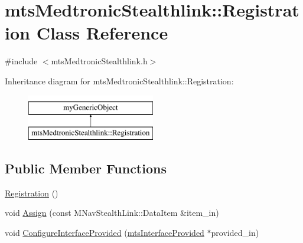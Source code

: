 \hypertarget{classmts_medtronic_stealthlink_1_1_registration}{}\section{mts\+Medtronic\+Stealthlink\+:\+:Registration Class Reference}
\label{classmts_medtronic_stealthlink_1_1_registration}


{\ttfamily \#include $<$mts\+Medtronic\+Stealthlink.\+h$>$}

Inheritance diagram for mts\+Medtronic\+Stealthlink\+:\+:Registration\+:\begin{figure}[H]
\begin{center}
\leavevmode
\includegraphics[height=2.000000cm]{d9/d2e/classmts_medtronic_stealthlink_1_1_registration}
\end{center}
\end{figure}
\subsection*{Public Member Functions}
\begin{DoxyCompactItemize}
\item 
\hyperlink{classmts_medtronic_stealthlink_1_1_registration_a8cf212c78930089706b7c7ab4de22250}{Registration} ()
\item 
void \hyperlink{classmts_medtronic_stealthlink_1_1_registration_aefbb9a745491a4306cdb9c156b7431d2}{Assign} (const M\+Nav\+Stealth\+Link\+::\+Data\+Item \&item\+\_\+in)
\item 
void \hyperlink{classmts_medtronic_stealthlink_1_1_registration_abbb8b70200e944f86a05ec85eba2428b}{Configure\+Interface\+Provided} (\hyperlink{classmts_interface_provided}{mts\+Interface\+Provided} $\ast$provided\+\_\+in)
\end{DoxyCompactItemize}
